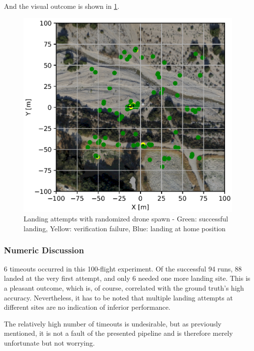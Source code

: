     And the visual outcome is shown in \cref{fig:landing_attempts_complete_rand}.

    \begin{figure}[h!]
        \begin{center}
            \includegraphics[scale=0.5]{images/evaluation/landings_complete_randomized_GT.png}
            \caption{Landing attempts with randomized drone spawn - Green: successful landing, Yellow: verification failure, Blue: landing at home position}
            \label{fig:landing_attempts_complete_rand}
        \end{center}
    \end{figure}

    \subsubsection{Numeric Discussion}
    6 timeouts occurred in this 100-flight experiment. Of the successful 94 runs, 88 landed at the very first attempt, and only 6 needed one more landing site. This is a pleasant outcome, which is, of course, correlated with the ground truth's high accuracy. Nevertheless, it has to be noted that multiple landing attempts at different sites are no indication of inferior performance. 

    The relatively high number of timeouts is undesirable, but as previously mentioned, it is not a fault of the presented pipeline and is therefore merely unfortunate but not worrying.


